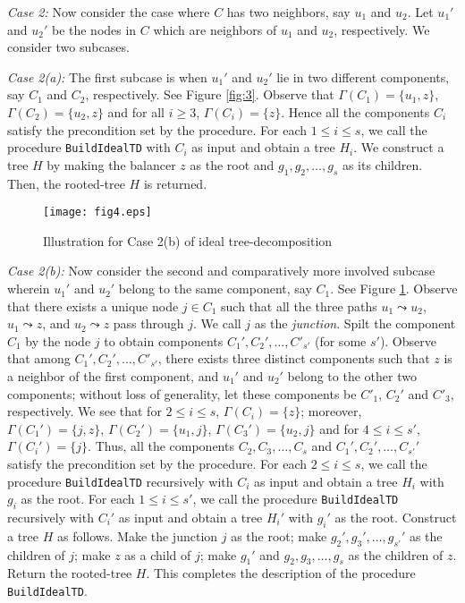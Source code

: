 \documentclass[11pt]{article}
\newcommand{\BuildITD} {{\tt BuildIdealTD}}
\begin{document}
{\it Case 2: }Now consider the case where $C$ has two neighbors, say $u_1$ and $u_2$.
Let $u_1'$ and $u_2'$ be the nodes in $C$ which are neighbors of $u_1$ and $u_2$, respectively.
We consider two subcases.

{\it Case 2(a): }
The first subcase is when $u_1'$ and $u_2'$ lie in two different components, say $C_1$ and $C_2$, respectively. 
See Figure \ref{fig:3}.
Observe that $\Gamma(C_1)=\{u_1,z\}$, $\Gamma(C_2)=\{u_2,z\}$ and for all $i \geq 3$,
$\Gamma(C_i)=\{z\}$. Hence all the components $C_i$ satisfy the precondition set by the procedure.
For each $1\leq i\leq s$, we call the procedure {\BuildITD} with $C_i$ as input and obtain 
a tree $H_i$. We construct a tree $H$ by making the balancer $z$ as the root and $g_1, g_2,\ldots, g_s$ as its children. 
Then, the rooted-tree $H$ is returned. 

\begin{figure}[t]
\centering
\texttt{[image: fig4.eps]}
\caption{Illustration for Case 2(b) of ideal tree-decomposition}
\label{fig:4}
\end{figure}

{\it Case 2(b): }
Now consider the second and comparatively more involved subcase wherein $u_1'$ and $u_2'$ belong to 
the same component, say $C_1$. See Figure \ref{fig:4}.
Observe that there exists a unique node $j\in C_1$ such that all the three paths 
$u_1\leadsto u_2$, $u_1\leadsto z$, and $u_2\leadsto z$ pass through $j$. We call $j$ as the {\em junction}.
Spilt the component $C_1$ by the node $j$ to obtain components $C_1', C_2', \ldots, C'_{s'}$ (for some $s'$).
Observe that among $C_1',C_2',\ldots, C'_{s'}$, 
there exists three distinct components such that $z$ is a neighbor of the first component,
and $u_1'$ and $u_2'$ belong to the other two components;
without loss of generality, let these components be $C'_1$, $C_2'$ and $C'_3$, respectively.
We see that for $2\leq i\leq s$, $\Gamma(C_i)=\{z\}$; moreover,
$\Gamma(C_1') = \{j,z\}$, $\Gamma(C_2')=\{u_1,j\}$, $\Gamma(C_3')=\{u_2,j\}$
and for $4\leq i\leq s'$, $\Gamma(C_i') = \{j\}$.
Thus, all the components $C_2,C_3,\ldots,C_s$ and $C_1',C_2',\ldots, C_{s'}'$
satisfy the precondition set by the procedure.
For each $2\leq i\leq s$, we call the procedure {\BuildITD} recursively with
$C_i$ as input and obtain a tree $H_i$ with $g_i$ as the root.
For each $1\leq i\leq s'$, we call the procedure {\BuildITD} recursively with
$C_i'$ as input and obtain a tree $H_i'$ with $g_i'$ as the root.
Construct a tree $H$ as follows. Make the junction $j$ as the root;
make $g_2',g_3',\ldots, g_{s'}'$ as the children of $j$;
make $z$ as a child of $j$; make $g_1'$ and $g_2, g_3,\ldots,g_s$ as the children of $z$.
Return the rooted-tree $H$. This completes the description of the procedure {\BuildITD}.
\end{document}
